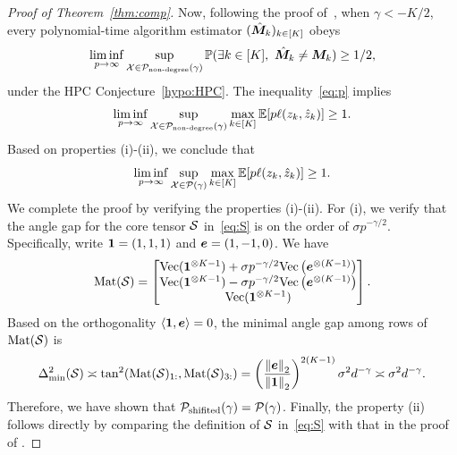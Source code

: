\documentclass[lettersize,onecolumn,journal]{IEEEtran}
\theoremstyle{definition}
\theoremstyle{definition}
\newcommand{\Mat}{\text{Mat}}
\begin{document}
\begin{proof}[Proof of Theorem~\ref{thm:comp}]
Now, following the proof of~\citet[Theorem 7]{han2020exact}, when $\gamma<-K/2$, every polynomial-time algorithm estimator $(\hat {\bm M}_k)_{k\in[K]}$ obeys
\begin{align}\label{eq:p}
\liminf_{p\to \infty} \sup_{\tX\in \tP_{\text{non-degree}}(\gamma)}\mathbb{P}(\exists k \in[K],\  \hat \mM_k \neq \mM_k)\geq 1/2,
\end{align}
under the HPC Conjecture~\ref{hypo:HPC}.
The inequality~\eqref{eq:p} implies
\[
\liminf_{p\to \infty} \sup_{\mathcal{X}\in \mathcal{P}_{\text{non-degree}}(\gamma)}\max_{k\in[K]}\mathbb{E}[p\ell(z_k, \hat z_k)]\geq 1.
\]
Based on properties (i)-(ii), we conclude that
\[
\liminf_{p\to \infty} \sup_{\mathcal{X}\in \mathcal{P}(\gamma)}\max_{k\in[K]}\mathbb{E}[p\ell(z_k, \hat z_k)]\geq 1.
\]
We complete the proof by verifying the properties (i)-(ii). For (i), we verify that the angle gap for the core tensor $\mathcal{S}$ in~\eqref{eq:S} is on the order of $\sigma p^{-\gamma/2}$. Specifically, write $\mathbf{1}=(1,1,1)$ and $\bm{e}=(1,-1,0)$. We have
\[
\Mat(\tS)=
\begin{bmatrix}
\text{Vec}(\mone^{\otimes K-1})+\sigma p^{-\gamma/2}\text{Vec}\left(\me^{\otimes (K-1)}\right) \\
\text{Vec}(\mone^{\otimes K-1})-\sigma p^{-\gamma/2}\text{Vec}\left(\me^{\otimes (K-1)}\right) \\
\text{Vec}(\mone^{\otimes K-1})
\end{bmatrix}.
\]
Based on the orthogonality $\langle \mathbf{1}, \bm{e}\rangle=0$, the minimal angle gap among rows of $\Mat(\tS)$ is
\begin{align}
\Delta^2_{\min}(\tS)\asymp \tan^2(\Mat(\tS)_{1:}, \Mat(\tS)_{3:})
=\left(\onorm{\me}_2 \over \onorm{\mone}_2\right)^{2(K-1)} \sigma^2 d^{-\gamma}\asymp \sigma^2 d^{-\gamma}.
\end{align}
Therefore, we have shown that $\mathcal{P}_{\text{shifited}}(\gamma)=\mathcal{P}(\gamma)$. Finally, the property (ii) follows directly by comparing the definition of $\mathcal{S}$ in~\eqref{eq:S} with that in the proof of \citet[Theorem 7]{han2020exact}. 
\end{proof}
\end{document}
